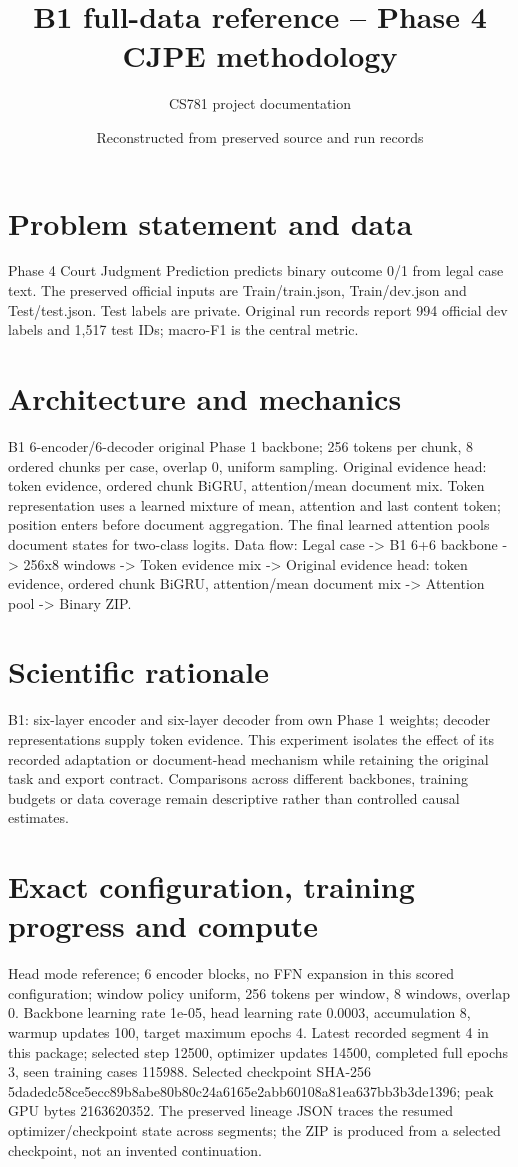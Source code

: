 \documentclass[11pt,a4paper]{article}
\begin{document}
\title{B1 full-data reference -- Phase 4 CJPE methodology}
\author{CS781 project documentation}
\date{Reconstructed from preserved source and run records}
\maketitle
\section{Problem statement and data}
Phase 4 Court Judgment Prediction predicts binary outcome 0/1 from legal case text. The preserved official inputs are Train/train.json, Train/dev.json and Test/test.json. Test labels are private. Original run records report 994 official dev labels and 1,517 test IDs; macro-F1 is the central metric.
\section{Architecture and mechanics}
B1 6-encoder/6-decoder original Phase 1 backbone; 256 tokens per chunk, 8 ordered chunks per case, overlap 0, uniform sampling. Original evidence head: token evidence, ordered chunk BiGRU, attention/mean document mix. Token representation uses a learned mixture of mean, attention and last content token; position enters before document aggregation. The final learned attention pools document states for two-class logits. Data flow: Legal case -> B1 6+6 backbone -> 256x8 windows -> Token evidence mix -> Original evidence head: token evidence, ordered chunk BiGRU, attention/mean document mix -> Attention pool -> Binary ZIP.
\section{Scientific rationale}
B1: six-layer encoder and six-layer decoder from own Phase 1 weights; decoder representations supply token evidence. This experiment isolates the effect of its recorded adaptation or document-head mechanism while retaining the original task and export contract. Comparisons across different backbones, training budgets or data coverage remain descriptive rather than controlled causal estimates.
\section{Exact configuration, training progress and compute}
Head mode reference; 6 encoder blocks, no FFN expansion in this scored configuration; window policy uniform, 256 tokens per window, 8 windows, overlap 0. Backbone learning rate 1e-05, head learning rate 0.0003, accumulation 8, warmup updates 100, target maximum epochs 4. Latest recorded segment 4 in this package; selected step 12500, optimizer updates 14500, completed full epochs 3, seen training cases 115988. Selected checkpoint SHA-256 5dadedc58ce5ecc89b8abe80b80c24a6165e2abb60108a81ea637bb3b3de1396; peak GPU bytes 2163620352. The preserved lineage JSON traces the resumed optimizer/checkpoint state across segments; the ZIP is produced from a selected checkpoint, not an invented continuation.
\end{document}
